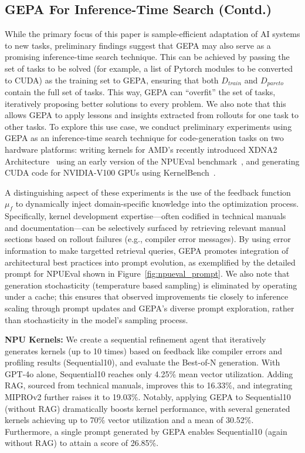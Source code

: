 \documentclass{article} %
\begin{document}
\subsection{GEPA For Inference-Time Search (Contd.)}\label{sec:inf_time_search_appendix}
While the primary focus of this paper is sample-efficient adaptation of AI systems to new tasks, preliminary findings suggest that GEPA may also serve as a promising inference-time search technique. This can be achieved by passing the set of tasks to be solved (for example, a list of Pytorch modules to be converted to CUDA) as the training set to GEPA, ensuring that both $D_{train}$ and $D_{pareto}$ contain the full set of tasks. This way, GEPA can ``overfit'' the set of tasks, iteratively proposing better solutions to every problem. We also note that this allows GEPA to apply lessons and insights extracted from rollouts for one task to other tasks. To explore this use case, we conduct preliminary experiments using GEPA as an inference-time search technique for code-generation tasks on two hardware platforms: writing kernels for AMD's recently introduced XDNA2 Architecture~\citep{amd_xdna2} using an early version of the NPUEval benchmark~\citep{npueval}, and generating CUDA code for NVIDIA-V100 GPUs using KernelBench~\citep{kernelbench}. 

A distinguishing aspect of these experiments is the use of the feedback function $\mu_f$ to dynamically inject domain-specific knowledge into the optimization process. Specifically, kernel development expertise—often codified in technical manuals and documentation—can be selectively surfaced by retrieving relevant manual sections based on rollout failures (e.g., compiler error messages). By using error information to make targetted retrieval queries, GEPA promotes integration of architectural best practices into prompt evolution, as exemplified by the detailed prompt for NPUEval shown in Figure~\ref{fig:npueval_prompt}. We also note that generation stochasticity (temperature based sampling) is eliminated by operating under a cache; this ensures that observed improvements tie closely to inference scaling through prompt updates and GEPA's diverse prompt exploration, rather than stochasticity in the model's sampling process.

\textbf{NPU Kernels:} We create a sequential refinement agent that iteratively generates kernels (up to 10 times) based on feedback like compiler errors and profiling results (Sequential10), and evaluate the Best-of-N generation. With GPT-4o alone, Sequential10 reaches only 4.25\% mean vector utilization. Adding RAG, sourced from technical manuals, improves this to 16.33\%, and integrating MIPROv2 further raises it to 19.03\%. Notably, applying GEPA to Sequential10 (without RAG) dramatically boosts kernel performance, with several generated kernels achieving up to 70\% vector utilization and a mean of 30.52\%. Furthermore, a single prompt generated by GEPA enables Sequential10 (again without RAG) to attain a score of 26.85\%.
\end{document}
